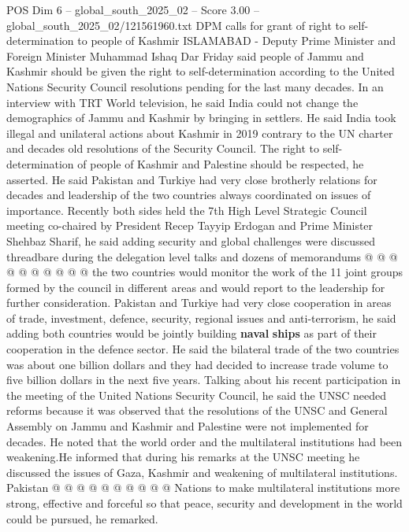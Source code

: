 \begin{textsample}{POS Dim 6 – global\_south\_2025\_02 – Score 3.00 – global\_south\_2025\_02/121561960.txt}  \label{ex:f6_pos_405}
DPM calls for grant of right to self-determination to people of Kashmir ISLAMABAD - Deputy Prime Minister and Foreign Minister Muhammad Ishaq Dar Friday said people of Jammu and Kashmir should be given the right to self-determination according to the United Nations Security Council resolutions pending for the last many decades.
In an interview with TRT World television, he said India could not change the demographics of Jammu and Kashmir by bringing in settlers.
He said India took illegal and unilateral actions about Kashmir in 2019 contrary to the UN charter and decades old resolutions of the Security Council.
The right to self-determination of people of Kashmir and Palestine should be respected, he asserted.
He said Pakistan and Turkiye had very close brotherly relations for decades and leadership of the two countries always coordinated on issues of importance.
Recently both sides held the 7th High Level Strategic Council meeting co-chaired by President Recep Tayyip Erdogan and Prime Minister Shehbaz Sharif, he said adding security and global challenges were discussed threadbare during the delegation level talks and dozens of memorandums @ @ @ @ @ @ @ @ @ @ the two countries would monitor the work of the 11 joint groups formed by the council in different areas and would report to the leadership for further consideration.
Pakistan and Turkiye had very close cooperation in areas of trade, investment, defence, security, regional issues and anti-terrorism, he said adding both countries would be jointly building \textbf{naval} \textbf{ships} as part of their cooperation in the defence sector.
He said the bilateral trade of the two countries was about one billion dollars and they had decided to increase trade volume to five billion dollars in the next five years.
Talking about his recent participation in the meeting of the United Nations Security Council, he said the UNSC needed reforms because it was observed that the resolutions of the UNSC and General Assembly on Jammu and Kashmir and Palestine were not implemented for decades.
He noted that the world order and the multilateral institutions had been weakening.He informed that during his remarks at the UNSC meeting he discussed the issues of Gaza, Kashmir and weakening of multilateral institutions.
Pakistan @ @ @ @ @ @ @ @ @ @ Nations to make multilateral institutions more strong, effective and forceful so that peace, security and development in the world could be pursued, he remarked.

\end{textsample}
